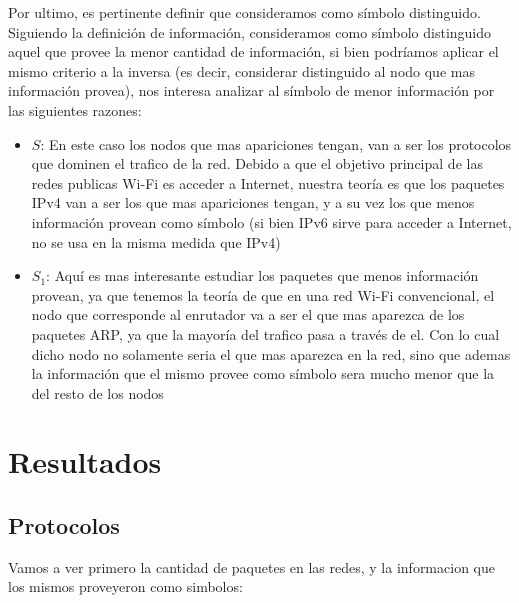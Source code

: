 Por ultimo, es pertinente definir que consideramos como símbolo distinguido. Siguiendo la definición de información, consideramos como símbolo distinguido aquel que provee la menor cantidad de información, si bien podríamos aplicar el mismo criterio a la inversa (es decir, considerar distinguido al nodo que mas información provea), nos interesa analizar al símbolo de menor información por las siguientes razones:

\begin{itemize}
	\item $S$: En este caso los nodos que mas apariciones tengan, van a ser los protocolos que dominen el trafico de la red. Debido a que el objetivo principal de las redes publicas Wi-Fi es acceder a Internet, nuestra teoría es que los paquetes IPv4 van a ser los que mas apariciones tengan, y a su vez los que menos información provean como símbolo (si bien IPv6 sirve para acceder a Internet, no se usa en la misma medida que IPv4)
	\item $S_1$: Aquí es mas interesante estudiar los paquetes que menos información provean, ya que tenemos la teoría de que en una red Wi-Fi convencional, el nodo que corresponde al enrutador va a ser el que mas aparezca de los paquetes ARP, ya que la mayoría del trafico pasa a través de el. Con lo cual dicho nodo no solamente seria el que mas aparezca en la red, sino que ademas la información que el mismo provee como símbolo sera mucho menor que la del resto de los nodos
\end{itemize}


\section{Resultados}

\subsection{Protocolos}

Vamos a ver primero la cantidad de paquetes en las redes, y la informacion que los mismos proveyeron como simbolos:

